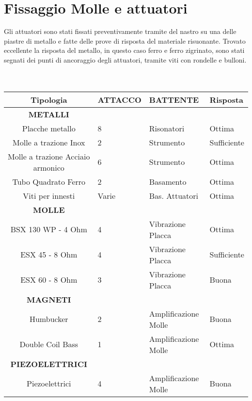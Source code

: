 \section{Fissaggio Molle e attuatori}

Gli attuatori sono stati fissati preventivamente tramite del nastro su una delle piastre di metallo e fatte delle prove di risposta del materiale risuonante. Trovato eccellente la risposta del metallo, in questo caso ferro e ferro zigrinato, sono stati segnati dei punti di ancoraggio degli attuatori, tramite viti con rondelle e bulloni. \\ \\
\\
\begin{tabular}{cp{2cm}p{2cm}p{2cm}} \textbf{Tipologia}&\textbf{ATTACCO}&\textbf{BATTENTE}&\textbf{Risposta}\\ 
\hline \textbf{METALLI}\\
\hline Placche metallo&8&Risonatori&Ottima\\
\hline Molle a trazione Inox&2&Strumento&Sufficiente\\
\hline Molle a trazione Acciaio armonico&6&Strumento&Ottima\\
\hline Tubo Quadrato Ferro&2&Basamento&Ottima\\
\hline Viti per innesti&Varie&Bas. Attuatori&Ottima\\
\hline \textbf{MOLLE}\\
\hline BSX 130 WP - 4 Ohm&4&Vibrazione Placca&Ottima\\ 
\hline ESX 45 - 8 Ohm&4&Vibrazione Placca&Sufficiente\\
\hline ESX 60 - 8 Ohm&3&Vibrazione Placca&Buona\\
\hline \textbf{MAGNETI}\\
\hline Humbucker&2&Amplificazione Molle&Buona\\
\hline Double Coil Bass&1&Amplificazione Molle&Ottima\\
\hline \textbf{PIEZOELETTRICI} \\
\hline Piezoelettrici&4&Amplificazione Molle&Buona\\
\hline 
\end{tabular}

